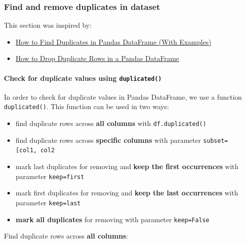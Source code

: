 \documentclass [oneside,10pt,a4paper,ngerman,BCOR10mm,headsepline,parindent,final]{scrartcl}
\providecommand{\tightlist}{%
      \setlength{\itemsep}{0pt}\setlength{\parskip}{0pt}}
\begin{document}
    \hypertarget{find-and-remove-duplicates-in-dataset}{%
\subsubsection{Find and remove duplicates in
dataset}\label{find-and-remove-duplicates-in-dataset}}

This section was inspired by:

\begin{itemize}
\tightlist
\item
  \href{https://www.statology.org/pandas-find-duplicates/}{How to Find
  Duplicates in Pandas DataFrame (With Examples)}
\item
  \href{https://www.statology.org/pandas-drop-duplicates/}{How to Drop
  Duplicate Rows in a Pandas DataFrame}
\end{itemize}

    \hypertarget{check-for-duplicate-values-using-duplicated}{%
\paragraph{\texorpdfstring{Check for duplicate values using
\texttt{duplicated()}}{Check for duplicate values using duplicated()}}\label{check-for-duplicate-values-using-duplicated}}

In order to check for duplicate values in Pandas DataFrame, we use a
function \texttt{duplicated()}. This function can be used in two ways:

\begin{itemize}
\tightlist
\item
  find duplicate rows across \textbf{all columns} with
  \texttt{df.duplicated()}
\item
  find duplicate rows across \textbf{specific columns} with parameter
  \texttt{subset={[}\textquotesingle{}col1\textquotesingle{},\ \textquotesingle{}col2\textquotesingle{}{]}}
\item
  mark last duplicates for removing and \textbf{keep the first
  occurrences} with parameter
  \texttt{keep=\textquotesingle{}first\textquotesingle{}}
\item
  mark first duplicates for removing and \textbf{keep the last
  occurrences} with parameter
  \texttt{keep=\textquotesingle{}last\textquotesingle{}}
\item
  \textbf{mark all duplicates} for removing with parameter
  \texttt{keep=False}
\end{itemize}

Find duplicate rows across \textbf{all columns}:
\end{document}
